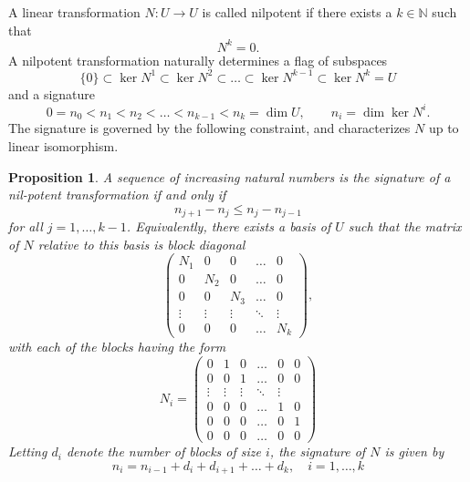 \documentclass[12pt]{article}
\newtheorem{proposition}{Proposition}
\begin{document}
A linear transformation $N: U\rightarrow U$ is called nilpotent if there exists a $k\in\mathbb{N}$ such that 
$$N^k = 0.$$
A nilpotent transformation naturally determines a flag of subspaces
$$ \{0\} \subset \ker N^1 \subset \ker N^2 \subset \ldots \subset \ker N^{k-1} \subset \ker N^k = U$$
and a signature
$$0  = n_0 < n_1 < n_2 < \ldots < n_{k-1} < n_k = \dim U,\qquad n_i =
\dim \ker N^i.$$
The signature is governed by the following constraint, and
characterizes $N$ up to linear isomorphism.
\begin{proposition}
A sequence of increasing natural numbers is the signature of a nil-potent transformation if and only if
$$n_{j+1} - n_{j} \leq n_{j} - n_{j-1}$$
for all $j=1,\ldots,k-1$.  Equivalently, there exists a basis of $U$
such that the matrix of $N$ relative to this basis is block diagonal
$$\begin{pmatrix}
N_1 & 0 & 0 & \ldots & 0\\
0 & N_2 & 0 & \ldots & 0 \\
0 & 0 & N_3 & \ldots & 0 \\
\vdots & \vdots & \vdots & \ddots & \vdots \\
0 & 0 & 0 & \ldots & N_k
\end{pmatrix},$$
with each of the blocks having the form
$$
N_i = \begin{pmatrix}
  0 & 1 & 0 & \ldots & 0 & 0 \\
  0 & 0 & 1 & \ldots & 0 & 0 \\
  \vdots & \vdots & \vdots & \ddots & \vdots \\
  0 & 0 & 0 & \ldots & 1 & 0 \\
  0 & 0 & 0 & \ldots & 0 & 1 \\
  0 & 0 & 0 & \ldots & 0 & 0   
\end{pmatrix}
$$
Letting $d_i$ denote the number of blocks of size $i$, the
signature of $N$ is given by
$$n_i = n_{i-1} + d_i + d_{i+1} + \ldots + d_k,\quad i=1,\ldots,k$$
\end{proposition}
\end{document}
